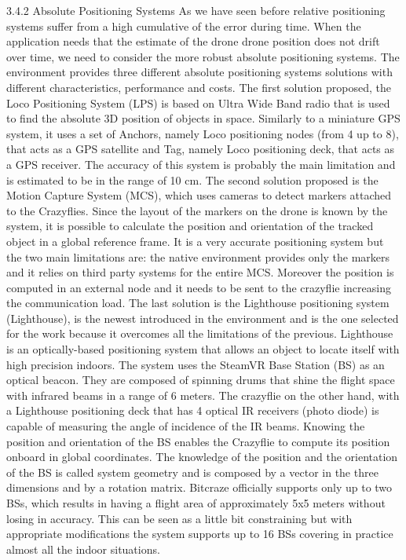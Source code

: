 3.4.2 Absolute Positioning Systems
As we have seen before relative positioning systems suffer from a high cumulative of the error during time. When the application needs that the estimate of the drone drone position does not drift over time, we need to consider the more robust absolute positioning systems. The environment provides three different absolute positioning systems solutions with different characteristics, performance and costs. 
The first solution proposed, the Loco Positioning System (LPS) is based on Ultra Wide Band radio that is used to find the absolute 3D position of objects in space. Similarly to a miniature GPS system, it uses a set of Anchors, namely Loco positioning nodes (from 4 up to 8), that acts as a GPS satellite and Tag, namely Loco positioning deck, that acts as a GPS receiver. The accuracy of this system is probably the main limitation and is estimated to be in the range of 10 cm. 
The second solution proposed is the Motion Capture System (MCS), which uses cameras to detect markers attached to the Crazyflies. Since the layout of the markers on the drone is known by the system, it is possible to calculate the position and orientation of the tracked object in a global reference frame. It is a very accurate positioning system but the two main limitations are: the native environment provides only the markers and it relies on third party systems for the entire MCS. Moreover the position is computed in an external node and it needs to be sent to the crazyflie increasing the communication load. 
The last solution is the Lighthouse positioning system (Lighthouse), is the newest introduced in the environment and is the one selected for the work because it overcomes all the limitations of the previous.
Lighthouse is an optically-based positioning system that allows an object to locate itself with high precision indoors. The system uses the SteamVR Base Station (BS) as an optical beacon. They are composed of spinning drums that shine the flight space with infrared beams in a range of 6 meters. The crazyflie on the other hand, with a Lighthouse positioning deck that has 4 optical IR receivers (photo diode) is capable of measuring the angle of incidence of the IR beams. Knowing the position and orientation of the BS enables the Crazyflie to compute its position onboard in global coordinates. The knowledge of the position and the orientation of the BS is called system geometry and is composed by a vector in the three dimensions and by a rotation matrix. Bitcraze officially supports only up to two BSs, which results in having a flight area of approximately 5x5 meters without losing in accuracy. This can be seen as a little bit constraining but with appropriate modifications the system supports up to 16 BSs covering in practice almost all the indoor situations. 
